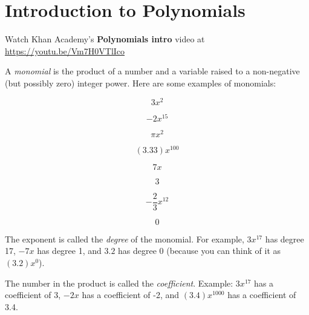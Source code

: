 \chapter{Introduction to Polynomials}

Watch Khan Academy's \textbf{Polynomials intro} video at \url{https://youtu.be/Vm7H0VTlIco}

A \emph{monomial} is the product of a number and a variable raised to a non-negative (but possibly zero) integer power. Here are some examples of monomials:
\begin{multicols}{4}
  \begin{equation*}
    3 x^2
  \end{equation*}

  \begin{equation*}
    -2 x^{15}
  \end{equation*}

  \begin{equation*}
    \pi x^2
  \end{equation*}

  \begin{equation*}
    (3.33)x^{100}
  \end{equation*}

  \begin{equation*}
    7x
  \end{equation*}

  \begin{equation*}
    3
  \end{equation*}

  \begin{equation*}
    -\frac{2}{3}x^{12}
  \end{equation*}

  \begin{equation*}
    0
  \end{equation*}

  
\end{multicols}

The exponent is called the \emph{degree} of the monomial. For example, $3x^{17}$
has degree 17, $-7x$ has degree 1, and $3.2$ has degree 0 (because you can think of it as $(3.2)x^0$).

The number in the product is called the \emph{coefficient}.  Example: $3x^{17}$ has a coefficient of 3, $-2x$ has a coefficient of -2, and $(3.4)x^{1000}$ has a coefficient of 3.4.


